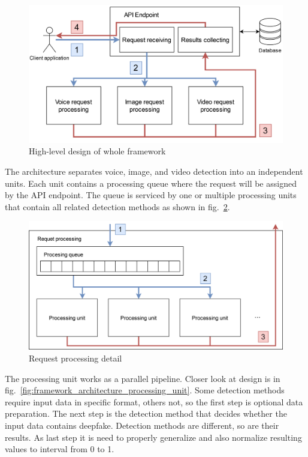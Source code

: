\begin{figure}[H]
    \centering
    \includegraphics[width=.7\linewidth]{other-fig/framework_architecture.png}
    \caption{High-level design of whole framework}
    \label{fig:framework_architecture}
\end{figure}

The architecture separates voice, image, and video detection into an independent units. Each unit contains a processing queue where the request will be assigned by the API endpoint. The queue is serviced by one or multiple processing units that contain all related detection methods as shown in fig.~\ref{fig:framework_architecture_request_processing}.

\begin{figure}[H]
    \centering
    \includegraphics[width=.65\linewidth]{other-fig/framework_architecture_request_processing.png}
    \caption{Request processing detail}
\label{fig:framework_architecture_request_processing}
\end{figure}

The processing unit works as a parallel pipeline. Closer look at design is in fig.~\ref{fig:framework_architecture_processing_unit}. Some detection methods require input data in specific format, others not, so the first step is optional data preparation. The next step is the detection method that decides whether the input data contains deepfake. Detection methods are different, so are their results. As last step it is need to properly generalize and also normalize resulting values to interval from 0 to 1.

